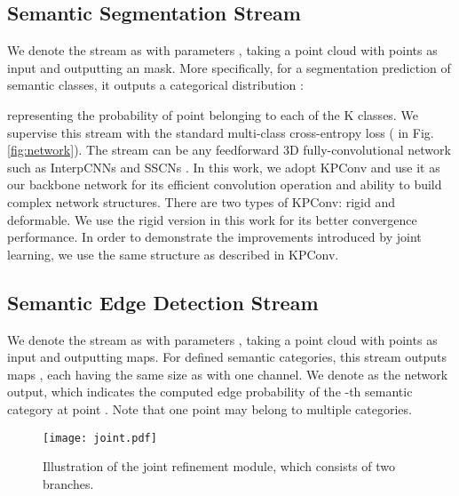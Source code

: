 \documentclass[runningheads]{llncs}
\begin{document}
\subsection{{Semantic} Segmentation Stream} \label{Segmentation stream}

We denote the 
{{\SemSeg} stream} as  with parameters , {taking a}
point cloud  with  points as input and outputting {an} {\SemSegPoint} mask.
More {specifically},
for a segmentation prediction of  semantic classes, it outputs a categorical distribution {:}
 
{representing} the probability of point  
{belonging} to each of the K classes. We supervise this stream with the standard multi-class cross-entropy loss ({ in Fig. \ref{fig:network}}). The {{\SemSeg}} stream can be any feedforward 3D fully-convolutional {\SemSeg} network such as InterpCNNs \cite{mao2019interpolated} and SSCNs \cite{graham20183d}. In this work, we adopt KPConv \cite{thomas2019kpconv} and use it as our backbone network for its {efficient convolution operation} and ability to build complex network structures. {There are two types of KPConv: rigid and deformable. We use the rigid version in this work for its better convergence performance.} In order to demonstrate the improvements introduced by joint learning, we use the same structure as described in KPConv.



\subsection{{Semantic} Edge Detection Stream
} \label{Semantic edge detection stream}
We denote the {{\SemEdgeD}} stream as  with parameters , taking a point cloud {} with  points as input and outputting {\SemEdgePoint} maps. For 
 defined semantic categories, {this} stream output{s}  {{\SemEdgePoint}} maps , each having the same size as  {with one channel}. We denote  as the network output, which indicates the computed edge probability 
{of}
the -th semantic category at point . Note that one point
{may} belong to multiple categories. 


\begin{figure*}[ht]
    \centering
    \texttt{[image: joint.pdf]}
    \caption{
    {Illustration of the joint refinement module, which} 
consists of two branches.
}
    \label{fig:joint}
\end{figure*}
\end{document}
